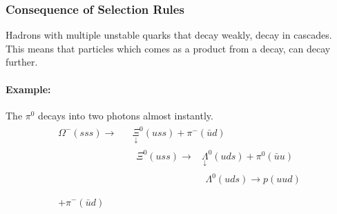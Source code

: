 \subsubsection{Consequence of Selection Rules}
Hadrons with multiple unstable quarks that decay weakly, decay in cascades. This means that particles which comes as a product from a decay, can decay further.

\paragraph{Example:}
The $π^{0}$ decays into two photons almost instantly.
\begin{align}
  \begin{aligned}
  &Ω^{-}(sss) → &&\underset{↓}{Ξ}^0(uss) + π^{-}(\bar{u}d) \\ 
   &&&\begin{aligned}
      Ξ^{0} (uss) → &\underset{↓}{Λ}^{0}(uds) + π^{0}(\bar{u}u)\\ 
      &\begin{aligned}
        Λ^{0} (uds) → p(uud) 
      \end{aligned}\\
    \end{aligned}\\ 
   &+ π^{-}(\bar{u}d)
\end{aligned}
\end{align}

